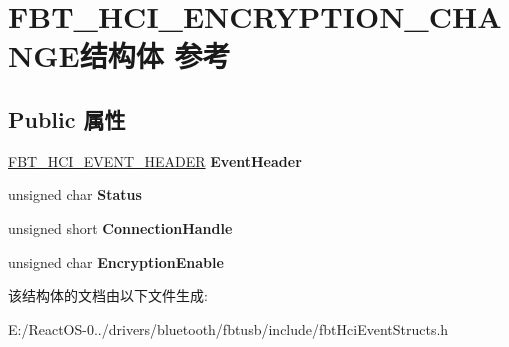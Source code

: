\hypertarget{struct_f_b_t___h_c_i___e_n_c_r_y_p_t_i_o_n___c_h_a_n_g_e}{}\section{F\+B\+T\+\_\+\+H\+C\+I\+\_\+\+E\+N\+C\+R\+Y\+P\+T\+I\+O\+N\+\_\+\+C\+H\+A\+N\+G\+E结构体 参考}
\label{struct_f_b_t___h_c_i___e_n_c_r_y_p_t_i_o_n___c_h_a_n_g_e}
\subsection*{Public 属性}
\begin{DoxyCompactItemize}
\item 
\mbox{\label{struct_f_b_t___h_c_i___e_n_c_r_y_p_t_i_o_n___c_h_a_n_g_e_a1abdd0cb8cbb01b8d3913b094909d468}} 
\hyperlink{struct_f_b_t___h_c_i___e_v_e_n_t___h_e_a_d_e_r}{F\+B\+T\+\_\+\+H\+C\+I\+\_\+\+E\+V\+E\+N\+T\+\_\+\+H\+E\+A\+D\+ER} {\bfseries Event\+Header}
\item 
\mbox{\label{struct_f_b_t___h_c_i___e_n_c_r_y_p_t_i_o_n___c_h_a_n_g_e_ae663f46e3b16ecd5ffee2dacf5e9d18e}} 
unsigned char {\bfseries Status}
\item 
\mbox{\label{struct_f_b_t___h_c_i___e_n_c_r_y_p_t_i_o_n___c_h_a_n_g_e_a03e34d3dd6441e72f2cd4a4e16bd4501}} 
unsigned short {\bfseries Connection\+Handle}
\item 
\mbox{\label{struct_f_b_t___h_c_i___e_n_c_r_y_p_t_i_o_n___c_h_a_n_g_e_a612e9d151f137322a5bd8b514da69a4b}} 
unsigned char {\bfseries Encryption\+Enable}
\end{DoxyCompactItemize}


该结构体的文档由以下文件生成\+:\begin{DoxyCompactItemize}
\item 
E\+:/\+React\+O\+S-\/0../drivers/bluetooth/fbtusb/include/fbt\+Hci\+Event\+Structs.\+h\end{DoxyCompactItemize}
